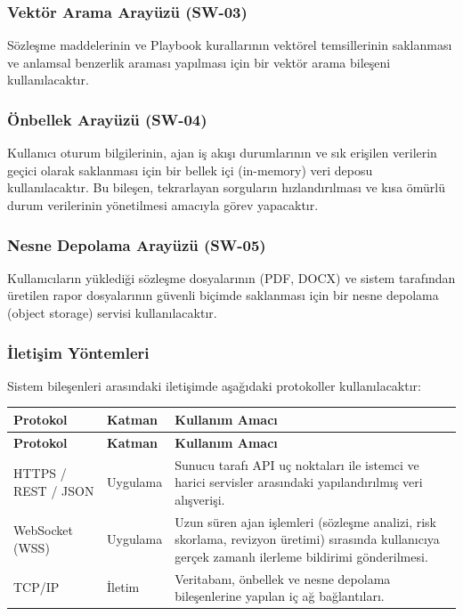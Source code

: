 \documentclass[12pt, a4paper]{article}
\begin{document}
\subsubsection{Vektör Arama Arayüzü (SW-03)}

Sözleşme maddelerinin ve Playbook kurallarının vektörel temsillerinin saklanması ve anlamsal benzerlik araması yapılması için bir vektör arama bileşeni kullanılacaktır.

\subsubsection{Önbellek Arayüzü (SW-04)}

Kullanıcı oturum bilgilerinin, ajan iş akışı durumlarının ve sık erişilen verilerin geçici olarak saklanması için bir bellek içi (in-memory) veri deposu kullanılacaktır. Bu bileşen, tekrarlayan sorguların hızlandırılması ve kısa ömürlü durum verilerinin yönetilmesi amacıyla görev yapacaktır.

\subsubsection{Nesne Depolama Arayüzü (SW-05)}

Kullanıcıların yüklediği sözleşme dosyalarının (PDF, DOCX) ve sistem tarafından üretilen rapor dosyalarının güvenli biçimde saklanması için bir nesne depolama (object storage) servisi kullanılacaktır.

\subsubsection{İletişim Yöntemleri}

Sistem bileşenleri arasındaki iletişimde aşağıdaki protokoller kullanılacaktır:

\begin{longtable}{|p{3.5cm}|p{3cm}|p{7cm}|}
\hline
\textbf{Protokol} & \textbf{Katman} & \textbf{Kullanım Amacı} \\
\hline
\endfirsthead
\hline
\textbf{Protokol} & \textbf{Katman} & \textbf{Kullanım Amacı} \\
\hline
\endhead
HTTPS / REST / JSON & Uygulama & Sunucu tarafı API uç noktaları ile istemci ve harici servisler arasındaki yapılandırılmış veri alışverişi. \\
\hline
WebSocket (WSS) & Uygulama & Uzun süren ajan işlemleri (sözleşme analizi, risk skorlama, revizyon üretimi) sırasında kullanıcıya gerçek zamanlı ilerleme bildirimi gönderilmesi. \\
\hline
TCP/IP & İletim & Veritabanı, önbellek ve nesne depolama bileşenlerine yapılan iç ağ bağlantıları. \\
\hline
\end{longtable}
\end{document}
